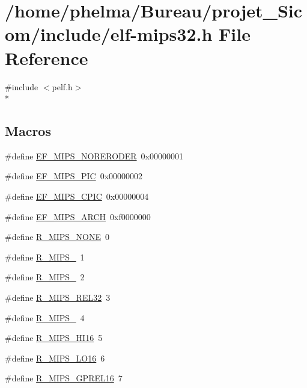 \hypertarget{elf-mips32_8h}{\section{/home/phelma/\-Bureau/projet\-\_\-\-Sicom/include/elf-\/mips32.h File Reference}
\label{elf-mips32_8h}
}
{\ttfamily \#include $<$pelf.\-h$>$}\\*
\subsection*{Macros}
\begin{DoxyCompactItemize}
\item 
\#define \hyperlink{elf-mips32_8h_a762d0a973a332ad951fc10099eeff6e3}{E\-F\-\_\-\-M\-I\-P\-S\-\_\-\-N\-O\-R\-E\-R\-O\-D\-E\-R}~0x00000001
\item 
\#define \hyperlink{elf-mips32_8h_ae85347bfe91539181e7b4e6d82d2be0e}{E\-F\-\_\-\-M\-I\-P\-S\-\_\-\-P\-I\-C}~0x00000002
\item 
\#define \hyperlink{elf-mips32_8h_a3a2ae70a257d712a9095d5e0c985ec57}{E\-F\-\_\-\-M\-I\-P\-S\-\_\-\-C\-P\-I\-C}~0x00000004
\item 
\#define \hyperlink{elf-mips32_8h_af648037d946f29cbcada3b2c7bac83d1}{E\-F\-\_\-\-M\-I\-P\-S\-\_\-\-A\-R\-C\-H}~0xf0000000
\item 
\#define \hyperlink{elf-mips32_8h_a92cb501f4c04605d295575d8d839fb4f}{R\-\_\-\-M\-I\-P\-S\-\_\-\-N\-O\-N\-E}~0
\item 
\#define \hyperlink{elf-mips32_8h_afa8cfd579492b34304c9a44d2f2ac59c}{R\-\_\-\-M\-I\-P\-S\-\_}~1
\item 
\#define \hyperlink{elf-mips32_8h_a82b1edcdac310704b643a413b98765fb}{R\-\_\-\-M\-I\-P\-S\-\_}~2
\item 
\#define \hyperlink{elf-mips32_8h_a3f4723de8983a418e9f8e920f8e7f331}{R\-\_\-\-M\-I\-P\-S\-\_\-\-R\-E\-L32}~3
\item 
\#define \hyperlink{elf-mips32_8h_a4b4535627d034fa18a4fb16a94339a79}{R\-\_\-\-M\-I\-P\-S\-\_}~4
\item 
\#define \hyperlink{elf-mips32_8h_ab2b28557420b61a9b2426ba0f3da2242}{R\-\_\-\-M\-I\-P\-S\-\_\-\-H\-I16}~5
\item 
\#define \hyperlink{elf-mips32_8h_ae48f227b7795b7f339f6a0328633e84e}{R\-\_\-\-M\-I\-P\-S\-\_\-\-L\-O16}~6
\item 
\#define \hyperlink{elf-mips32_8h_a4da7ab1035569f224fafbc7df547987a}{R\-\_\-\-M\-I\-P\-S\-\_\-\-G\-P\-R\-E\-L16}~7

\end{DoxyCompactItemize}
